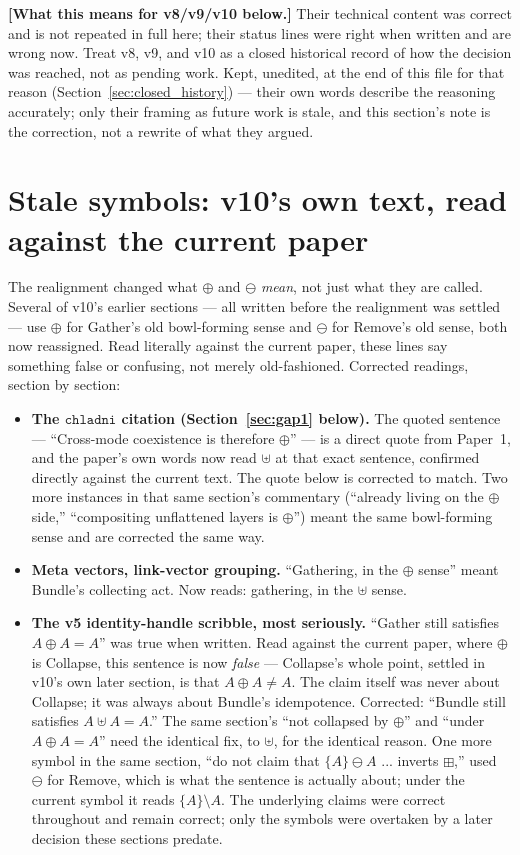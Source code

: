 \documentclass[11pt]{article}
\begin{document}
\textbf{[What this means for v8/v9/v10 below.]} Their technical content
was correct and is not repeated in full here; their status lines were
right when written and are wrong now. Treat v8, v9, and v10 as a
closed historical record of how the decision was reached, not as
pending work. Kept, unedited, at the end of this file for that reason
(Section~\ref{sec:closed_history}) --- their own words describe the
reasoning accurately; only their framing as future work is stale, and
this section's note is the correction, not a rewrite of what they
argued.

\section{Stale symbols: v10's own text, read against the current
paper}

The realignment changed what $\oplus$ and $\ominus$ \emph{mean}, not
just what they are called. Several of v10's earlier sections --- all
written before the realignment was settled --- use $\oplus$ for
Gather's old bowl-forming sense and $\ominus$ for Remove's old sense,
both now reassigned. Read literally against the current paper, these
lines say something false or confusing, not merely old-fashioned.
Corrected readings, section by section:

\begin{itemize}
\item \textbf{The $\mathtt{chladni}$ citation (Section~\ref{sec:gap1}
below).} The quoted sentence --- ``Cross-mode coexistence is
therefore $\oplus$'' --- is a direct quote from Paper~1, and the
paper's own words now read $\uplus$ at that exact sentence, confirmed
directly against the current text. The quote below is corrected to
match. Two more instances in that same section's commentary (``already
living on the $\oplus$ side,'' ``compositing unflattened layers is
$\oplus$'') meant the same bowl-forming sense and are corrected the
same way.

\item \textbf{Meta vectors, link-vector grouping.} ``Gathering, in the
$\oplus$ sense'' meant Bundle's collecting act. Now reads: gathering,
in the $\uplus$ sense.

\item \textbf{The v5 identity-handle scribble, most seriously.} ``Gather
still satisfies $A\oplus A=A$'' was true when written. Read against
the current paper, where $\oplus$ is Collapse, this sentence is now
\emph{false} --- Collapse's whole point, settled in v10's own later
section, is that $A\oplus A\ne A$. The claim itself was never about
Collapse; it was always about Bundle's idempotence. Corrected: ``Bundle
still satisfies $A\uplus A=A$.'' The same section's ``not collapsed by
$\oplus$'' and ``under $A\oplus A=A$'' need the identical fix, to
$\uplus$, for the identical reason. One more symbol in the same
section, ``do not claim that $\{A\}\ominus A$ ... inverts $\boxplus$,''
used $\ominus$ for Remove, which is what the sentence is actually
about; under the current symbol it reads $\{A\}\setminus A$. The
underlying claims were correct throughout and remain correct; only the
symbols were overtaken by a later decision these sections predate.
\end{itemize}
\end{document}
